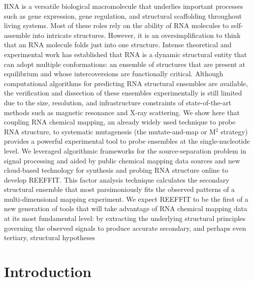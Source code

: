 \documentclass[12pt]{article}
\begin{document}
RNA is a versatile biological macromolecule that underlies important processes such as gene expression, gene regulation, and structural scaffolding throughout living systems. 
Most of these roles rely on the ability of RNA molecules to self-assemble into intricate structures.
However, it is an oversimplification to think that an RNA molecule folds just into one structure. 
Intense theoretical and experimental work has established that RNA is a dynamic structural entity that can adopt multiple conformations: an ensemble of structures that are present at equilibrium and whose intercoversions are functionally critical. 
Although computational algorithms for predicting RNA structural ensembles are available, the verification and dissection of these ensembles experimentally is still limited due to the size, resolution, and infrastructure constraints of state-of-the-art methods such as magnetic resonance and X-ray scattering. 
We show here that coupling RNA chemical mapping, an already widely used technique to probe RNA structure, to systematic mutagenesis (the mutate-and-map or M$^2$ strategy) provides a powerful experimental tool to probe ensembles at the single-nucleotide level. 
We leveraged algorithmic frameworks for the source-separation problem in signal processing and aided by public chemical mapping data sources and new cloud-based technology for synthesis and probing RNA structure online to develop REEFFIT. This factor analysis technique calculates the secondary structural ensemble that most parsimoniously fits the observed patterns of a multi-dimensional mapping experiment. 
We expect REEFFIT to be the first of a new generation of tools that will take advantage of RNA chemical mapping data at its most fundamental level: by extracting the underlying structural principles governing the observed signals to produce accurate secondary, and perhaps even tertiary, structural hypotheses


\section{Introduction}
\end{document}
